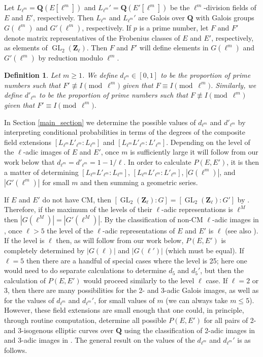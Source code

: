 \documentclass{amsart}
\newcommand{\Zl}{\mathbf{Z}_{\ell}}
\newcommand{\Q}{\mathbf{Q}}
\newcommand{\GL}{\operatorname{GL}}
\numberwithin{equation}{section}
\theoremstyle{plain}
\newtheorem{defn}[equation]{Definition}
\theoremstyle{remark}
\begin{document}
Let $L_{\ell^m} = \Q(E[\ell^m])$ and  $L_{\ell^m}' = \Q(E'[\ell^m])$ be the $\ell^m$-division fields of $E$ and $E'$, respectively.  Then $L_{\ell^m}$ and $L_{\ell^m}'$ are Galois over $\Q$ with Galois groups $G(\ell^m)$ and $G'(\ell^m)$, respectively.   If $p$ is a prime number, let $F$ and $F'$ denote matrix representatives of the Frobenius classes of $E$ and $E'$, respectively, as elements of $\GL_2(\Zl)$.  Then $F$ and $F'$ will define elements in $G(\ell^m)$ and $G'(\ell^m)$ by reduction modulo $\ell^m$. 

\begin{defn}
Let $m \geq 1$. We define $d_{\ell^m} \in [0, 1]$  to be the proportion of prime numbers such
that $F' \not \equiv I \pmod{\ell^m}$ given that $F \equiv I \pmod{\ell^m}$.  Similarly, we define $d'_{\ell^m}$ to be the proportion of prime numbers such
that $F \not \equiv I \pmod{\ell^m}$ given that $F' \equiv I \pmod{\ell^m}$. 
\end{defn}

In Section \ref{main_section} we determine the possible values of $d_{\ell^m}$ and $d'_{\ell^m}$ by interpreting conditional probabilities in terms of the degrees of the composite field extensions $[L_{\ell^m}L'_{\ell^m}:L_{\ell^m}]$ and $[L_{\ell^m}L'_{\ell^m}:L'_{\ell^m}]$.  Depending on the level of the $\ell$-adic images of $E$ and $E'$, once $m$ is sufficiently large it will follow from our work below that $d_{\ell^m} = d'_{\ell^m} = 1-1/\ell$.   In order to calculate $P(E,E')$, it is then a matter of determining $[L_{\ell^m}L'_{\ell^m}:L_{\ell^m}]$, $[L_{\ell^m}L'_{\ell^m}:L'_{\ell^m}]$, $|G(\ell^m)|$, and $|G'(\ell^m)|$ for small $m$ and then summing a geometric series.

If $E$ and $E'$ do not have CM, then $[\GL_2(\Zl):G] = [\GL_2(\Zl):G']$ by \cite[Prop.~2.1.1]{greenberg5}.  Therefore, if the maximum of the levels of their $\ell$-adic representations is $\ell^M$ then $|G(\ell^M)| = |G'(\ell^M)|$.  By the classification of non-CM $\ell$-adic images in \cite{rszb}, once $\ell >5$ the level of the $\ell$-adic representations of $E$ and $E'$ is $\ell$ (see also \cite{greenberg7}).  If the level is  $\ell$ then, as will follow from our work below, $P(E,E')$ is completely determined  by $|G(\ell)|$ and $|G(\ell')|$ (which must be equal).  If $\ell=5$ then there are a handful of special cases where the level is 25; here one would need to do separate calculations to determine $d_5$ and $d_5'$, but then the calculation of $P(E,E')$ would proceed similarly to the level $\ell$ case.  If $\ell=2$ or 3, then there are many possibilities for the 2- and 3-adic Galois images, as well as for the values of $d_{\ell^m}$ and $d_{\ell^m}'$, for small values of $m$ (we can always take $m \leq 5$).  However, these field extensions are small enough that one could, in principle, through routine computation, determine all possible $P(E,E')$ for all pairs of 2- and 3-isogenous elliptic curves over $\Q$ using the classification of 2-adic images in \cite{rzb} and 3-adic images in \cite{rszb}.   The general result on the values of the $d_{\ell^m}$ and $d_{\ell^m}'$ is as follows.
\end{document}
